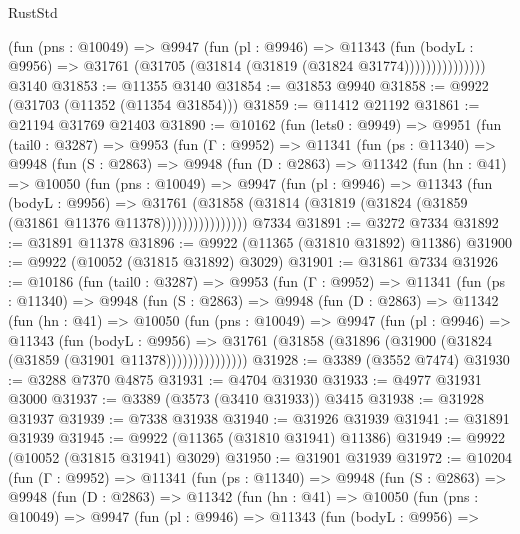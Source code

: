 \begin{lexlean}{RustStd}
\begin{coremodule}
                    (fun (pns : @10049) =>
                    @9947
                      (fun (pl : @9946) =>
                      @11343
                        (fun (bodyL : @9956) =>
                        @31761 (@31705 (@31814 (@31819 (@31824 @31774)))))))))))))))
    @3140
@31853 := @11355 @3140
@31854 := @31853 @9940
@31858 := @9922 (@31703 (@11352 (@11354 @31854)))
@31859 := @11412 @21192
@31861 := @21194 @31769 @21403
@31890 := @10162
    (fun (lets0 : @9949) =>
    @9951
      (fun (tail0 : @3287) =>
      @9953
        (fun (Γ : @9952) =>
        @11341
          (fun (ps : @11340) =>
          @9948
            (fun (S : @2863) =>
            @9948
              (fun (D : @2863) =>
              @11342
                (fun (hn : @41) =>
                @10050
                  (fun (pns : @10049) =>
                  @9947
                    (fun (pl : @9946) =>
                    @11343
                      (fun (bodyL : @9956) =>
                      @31761
                        (@31858
                          (@31814 (@31819 (@31824 (@31859 (@31861 @11376 @11378))))))))))))))))
    @7334
@31891 := @3272 @7334
@31892 := @31891 @11378
@31896 := @9922 (@11365 (@31810 @31892) @11386)
@31900 := @9922 (@10052 (@31815 @31892) @3029)
@31901 := @31861 @7334
@31926 := @10186
    (fun (tail0 : @3287) =>
    @9953
      (fun (Γ : @9952) =>
      @11341
        (fun (ps : @11340) =>
        @9948
          (fun (S : @2863) =>
          @9948
            (fun (D : @2863) =>
            @11342
              (fun (hn : @41) =>
              @10050
                (fun (pns : @10049) =>
                @9947
                  (fun (pl : @9946) =>
                  @11343
                    (fun (bodyL : @9956) =>
                    @31761 (@31858 (@31896 (@31900 (@31824 (@31859 (@31901 @11378)))))))))))))))
@31928 := @3389 (@3552 @7474)
@31930 := @3288 @7370 @4875
@31931 := @4704 @31930
@31933 := @4977 @31931 @3000
@31937 := @3389 (@3573 (@3410 @31933)) @3415
@31938 := @31928 @31937
@31939 := @7338 @31938
@31940 := @31926 @31939
@31941 := @31891 @31939
@31945 := @9922 (@11365 (@31810 @31941) @11386)
@31949 := @9922 (@10052 (@31815 @31941) @3029)
@31950 := @31901 @31939
@31972 := @10204
    (fun (Γ : @9952) =>
    @11341
      (fun (ps : @11340) =>
      @9948
        (fun (S : @2863) =>
        @9948
          (fun (D : @2863) =>
          @11342
            (fun (hn : @41) =>
            @10050
              (fun (pns : @10049) =>
              @9947
                (fun (pl : @9946) =>
                @11343
                  (fun (bodyL : @9956) =>

\end{coremodule}
\end{lexlean}
